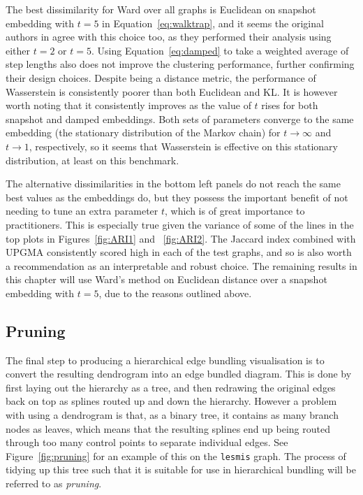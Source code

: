 The best dissimilarity for Ward over all graphs is Euclidean on snapshot embedding with $t=5$ in Equation~\eqref{eq:walktrap}, and it seems the original authors in \citet{Pons2006} agree with this choice too, as they performed their analysis using either $t=2$ or $t=5$.
Using Equation~\ref{eq:damped} to take a weighted average of step lengths also does not improve the clustering performance, further confirming their design choices.
Despite being a distance metric, the performance of Wasserstein is consistently poorer than both Euclidean and KL. It is however worth noting that it consistently improves as the value of $t$ rises for both snapshot and damped embeddings. Both sets of parameters converge to the same embedding (the stationary distribution of the Markov chain) for $t\rightarrow \infty$ and $t\rightarrow 1$, respectively, so it seems that Wasserstein is effective on this stationary distribution, at least on this benchmark.

The alternative dissimilarities in the bottom left panels do not reach the same best values as the embeddings do, but they possess the important benefit of not needing to tune an extra parameter $t$, which is of great importance to practitioners. This is especially true given the variance of some of the lines in the top plots in Figures~\ref{fig:ARI1} and ~\ref{fig:ARI2}.
The Jaccard index combined with UPGMA consistently scored high in each of the test graphs, and so is also worth a recommendation as an interpretable and robust choice.
The remaining results in this chapter will use Ward's method on Euclidean distance over a snapshot embedding with $t=5$, due to the reasons outlined above.

\subsection{Pruning}
\label{sec:pruning}
The final step to producing a hierarchical edge bundling visualisation is to convert the resulting dendrogram into an edge bundled diagram. This is done by first laying out the hierarchy as a tree, and then redrawing the original edges back on top as splines routed up and down the hierarchy.
However a problem with using a dendrogram is that, as a binary tree, it contains as many branch nodes as leaves, which means that the resulting splines end up being routed through too many control points to separate individual edges. See Figure~\ref{fig:pruning} for an example of this on the \texttt{lesmis} graph.
The process of tidying up this tree such that it is suitable for use in hierarchical bundling will be referred to as \emph{pruning}. 

